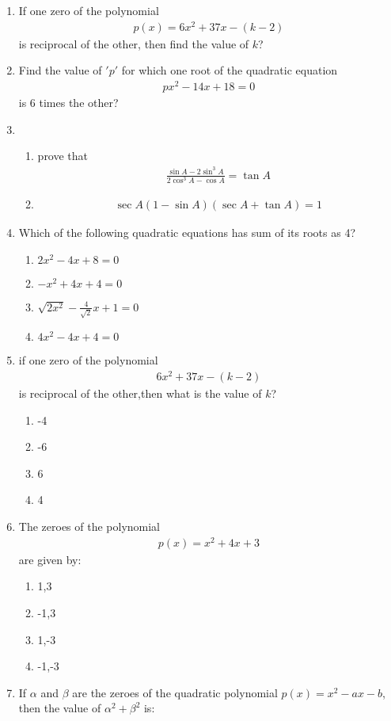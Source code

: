 %
\begin{enumerate}
 \item If one zero of the polynomial \begin{align} p(x)=6x^2+37x-(k-2) \end{align} is reciprocal of the other, then find the value of $k$?
 \item Find the value of $'p'$ for which one root of the quadratic equation \begin{align} px^2-14x+18=0 \end{align}is 6 times the other?
 \item 
 \begin{enumerate}
  \item prove that \begin{align} \frac{\sin A-2 \sin^3A}{2\cos^3A-\cos A}=\tan A\end{align} 
  \item \begin{align} \sec A (1-\sin A)(\sec A+\tan A)=1\end{align} 
  \end{enumerate}
  \item Which of the following  quadratic equations has sum of its roots as 4?
  \begin{enumerate}
      \item $2x^2-4x+8=0$ 
      \item $-x^2+4x+4=0$
      \item $\sqrt{2x^2}-\frac{4}{\sqrt{2}}x+1=0$ 
      \item $4x^2-4x+4=0$
   \end{enumerate}
   \item if one zero of the polynomial \begin{align} 6x^2+37x-(k-2)\end{align}  is reciprocal of the other,then what is the value of $k$?
   \begin{enumerate}
       \item -4
       \item -6
       \item 6
       \item 4
   \end{enumerate}
   \item The zeroes of the polynomial \begin{align}p(x)=x^2+4x+3\end{align}  are given by:
   \begin{enumerate}
       \item 1,3
       \item -1,3
       \item 1,-3
       \item -1,-3
   \end{enumerate}
\item If $\alpha$ and $\beta$ are the zeroes of the quadratic polynomial $p(x)=x^2-ax-b$, then the value of $\alpha^2 + \beta^2$ is:



\end{enumerate}
